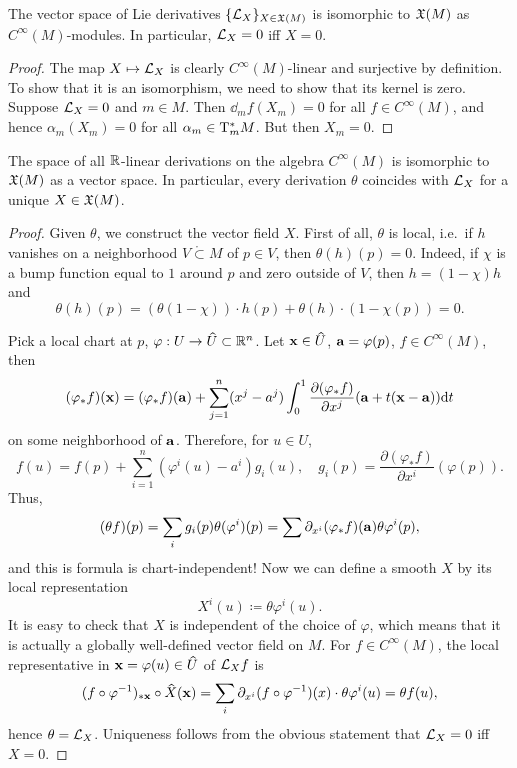 \begin{prop}\label{prop 2.2.9 Marsden}
    The vector space of Lie derivatives $\{\Lie_X\}_{X\in\fX(M)}$ is isomorphic to $\fX(M)$ as $C^\infty(M)$-modules. In particular, $\Lie_X=0$ iff $X=0$.
\end{prop}
\begin{proof}
    The map $X\mapsto \calL_X$ is clearly $C^\infty(M)$-linear and surjective by definition. To show that it is an isomorphism, we need to show that its kernel is zero. Suppose $\calL_X=0$ and $m\in M$. Then $\dd_m f(X_m)=0$ for all $f\in C^\infty(M)$, and hence $\alpha_m(X_m)=0$ for all $\alpha_m\in \T_m^\ast M$. But then $X_m=0$.
\end{proof}
\begin{prop}\label{lie derivatives and vector fields}
The space of all $\bbR $-linear derivations on the algebra $C^\infty(M)$ is isomorphic to $\fX(M)$ as a vector space. In particular, every derivation $\theta$ coincides with $\Lie_X$ for a unique $X\in\fX(M)$.
\end{prop}
\begin{proof}
    Given $\theta$, we construct the vector field $X$.
    First of all, $\theta$ is local, i.e.\ if $h$ vanishes on a neighborhood $V\mathring{\subset} M$ of $p\in V$, then $\theta(h)(p)=0$. Indeed, if $\chi$ is a bump function equal to $1$ around $p$ and zero outside of $V$, then $h=(1-\chi)h$ and
    \[\theta(h)(p)=(\theta(1-\chi))\cdot h(p)+\theta(h)\cdot (1-\chi(p))=0.\]

    Pick a local chart at $p$, $\varphi:U\to\wh{U}\subset\bbR^n$. Let $\bf{x}\in\wh{U}$, $\bf{a}=\varphi(p)$, $f\in C^\infty(M)$, then 
    \[(\varphi_\ast f)(\bf{x})=(\varphi_\ast f)(\bf{a})+\sum_{j=1}^n (x^j-a^j)\int_0^1 \frac{\partial(\varphi_\ast f)}{\partial x^j} (\bf{a}+t(\bf{x}-\bf{a}))\dd t\]
    on some neighborhood of $\bf{a}$.
    Therefore, for $u\in U$,
    \[f(u)=f(p)+\sum_{i=1}^n (\varphi^i(u)-a^i)g_i(u),\quad g_i(p)=\frac{\partial(\varphi_\ast f)}{\partial x^i} (\varphi(p)).\] 
    Thus,
    \[(\theta f)(p)=\sum_i g_i(p)\theta(\varphi^i)(p)=\sum \partial_{x^i}(\varphi_\ast f)(\bf{a}) \theta \varphi^i(p),\]
    and this is formula is chart-independent! Now we can define a smooth $X$ by its local representation
    \[X^i(u)\coloneqq \theta\varphi^i(u).\]
    It is easy to check that $X$ is independent of the choice of $\varphi$, which means that it is actually a globally well-defined vector field on $M$. For $f\in C^\infty(M)$, the local representative in $\bf{x}=\varphi(u)\in\wh{U}$ of $\Lie_X f$ is 
    \[(f\circ\varphi^{-1})_{\ast \bf{x}}\circ \wh{X}(\bf{x})=\sum_i \partial_{x^i}(f\circ \varphi^{-1})(x)\cdot \theta \varphi^i (u)=\theta f(u),\]
    hence $\theta=\Lie_X$.
    Uniqueness follows from the obvious statement that $\Lie_X=0$ iff $X=0$.
\end{proof}
